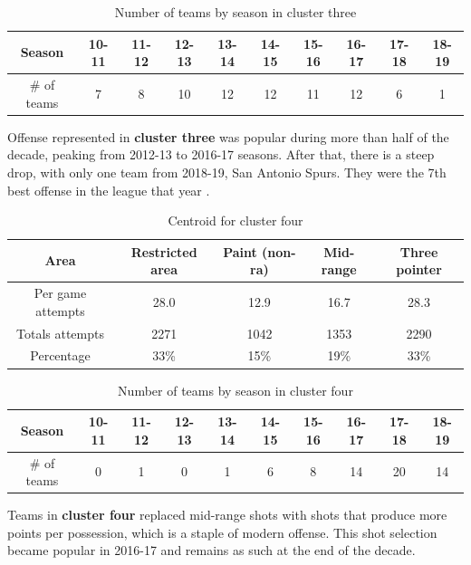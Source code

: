 \documentclass[a4paper]{article}
\begin{document}
\begin{table}[!h]
\begin{tabular}{|c|c|c|c|c|c|c|c|c|c|} \hline
Season & 10-11 & 11-12 & 12-13 & 13-14 & 14-15 & 15-16 & 16-17 & 17-18 & 18-19 \\ \hline
\# of teams & 7 & 8 & 10 & 12 & 12 & 11 & 12 & 6 & 1 \\ \hline
\end{tabular}
\caption{Number of teams by season in cluster three}
\label{tab:clust_shooting_by_teams_num3}
\end{table}

Offense represented in \textbf{cluster three} was popular during more than half of the decade, peaking from 2012-13 to 2016-17 seasons. After that, there is a steep drop, with only one team from 2018-19, San Antonio Spurs. They were the 7th best offense in the league that year .

\begin{table}[!h]
\begin{center}
\begin{tabular}{|c|c|c|c|c|} \hline
Area & Restricted area & Paint (non-ra) & Mid-range & Three pointer \\ \hline
Per game attempts & 28.0 & 12.9 & 16.7 & 28.3  \\ \hline
Totals attempts & 2271 & 1042 & 1353 & 2290  \\ \hline
Percentage & 33\% & 15\% & 19\% & 33\% \\ \hline
\end{tabular}
\caption{Centroid for cluster four}
\label{tab:clust_shooting_by_teams_centr4}
\end{center}
\end{table}

\begin{table}[!h]
\begin{tabular}{|c|c|c|c|c|c|c|c|c|c|} \hline
Season & 10-11 & 11-12 & 12-13 & 13-14 & 14-15 & 15-16 & 16-17 & 17-18 & 18-19 \\ \hline
\# of teams & 0 & 1 & 0 & 1 & 6 & 8 & 14 & 20 & 14 \\ \hline
\end{tabular}
\caption{Number of teams by season in cluster four}
\label{tab:clust_shooting_by_teams_num4}
\end{table}

Teams in \textbf{cluster four} replaced mid-range shots with shots that produce more points per possession, which is a staple of modern offense. This shot selection became popular in 2016-17 and remains as such at the end of the decade.
\end{document}
